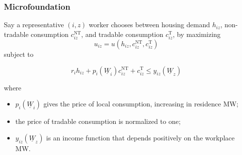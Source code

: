 \documentclass[aspectratio=169, t]{beamer}
\newcommand{\MW}{\underline{W}}
\begin{document}
\begin{frame}[label = microfound]
    \frametitle{Microfoundation}
    Say a representative $(i,z)$ worker chooses between housing demand $h_{iz}$,
    non-tradable consumption $c^{\text{NT}}_{iz}$, and tradable consumption $c^{\text{T}}_{iz}$,
    by maximizing
    \[
    u_{iz} = u \left(h_{iz}, c^{\text{NT}}_{iz}, c^{\text{T}}_{iz}\right)
    \]
    subject to

    \[
    r_i h_{iz} + p_i(\MW_i) c^{\text{NT}}_{iz} + c^{\text{T}}_{iz} \leq y_{iz}(\MW_z)
    \]

    where 
    \begin{itemize}
        \item $p_i(\MW_i)$ gives the price of local consumption, increasing in residence MW;
        \item the price of tradable consumption is normalized to one;  
        \item $y_{iz}(\MW_z)$ is an income function that depends positively on the workplace MW.
    \end{itemize}
\end{frame}
\end{document}
